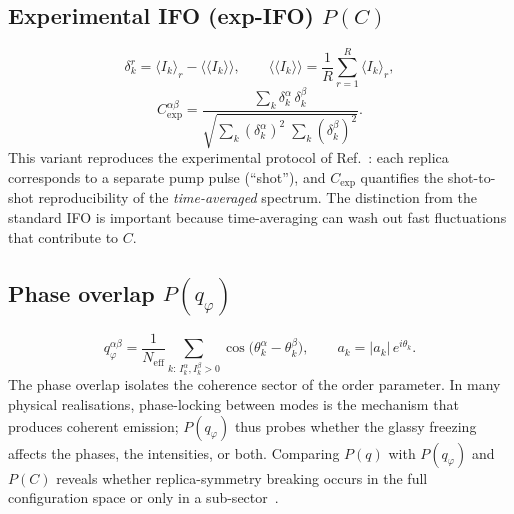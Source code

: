 \documentclass[11pt,a4paper]{article}
\newcommand{\avg}[1]{\langle #1 \rangle}
\begin{document}
\subsection{Experimental IFO (exp-IFO) $P(C)$}\label{sec:expifo}
\begin{equation}
  \delta_k^{r} = \avg{I_k}_r - \avg{\avg{I_k}},
  \qquad
  \avg{\avg{I_k}} = \frac{1}{R}\sum_{r=1}^{R} \avg{I_k}_r,
\end{equation}
\begin{equation}
  C_{\mathrm{exp}}^{\alpha\beta}
  = \frac{\sum_k \delta_k^{\alpha}\,\delta_k^{\beta}}
         {\sqrt{\sum_k (\delta_k^{\alpha})^2\;\sum_k (\delta_k^{\beta})^2}}.
\end{equation}
This variant reproduces the experimental protocol of
Ref.~\cite{Ghofraniha2015}: each replica corresponds to a separate
pump pulse (``shot''), and $C_{\mathrm{exp}}$ quantifies the
shot-to-shot reproducibility of the \emph{time-averaged} spectrum.
The distinction from the standard IFO is important because
time-averaging can wash out fast fluctuations that contribute to $C$.

\subsection{Phase overlap $P(q_\varphi)$}\label{sec:phase}
\begin{equation}
  q_\varphi^{\alpha\beta}
  = \frac{1}{N_{\mathrm{eff}}} \sum_{k:\,I_k^\alpha,I_k^\beta > 0}
    \cos\!\bigl(\theta_k^{\alpha} - \theta_k^{\beta}\bigr),
  \qquad
  a_k = |a_k|\,e^{i\theta_k}.
\end{equation}
The phase overlap isolates the coherence sector of the order
parameter.  In many physical realisations, phase-locking between
modes is the mechanism that produces coherent emission; $P(q_\varphi)$
thus probes whether the glassy freezing affects the phases,
the intensities, or both.
Comparing $P(q)$ with $P(q_\varphi)$ and $P(C)$ reveals whether
replica-symmetry breaking occurs in the full configuration space or
only in a sub-sector~\cite{Antenucci2015b}.

\end{document}

